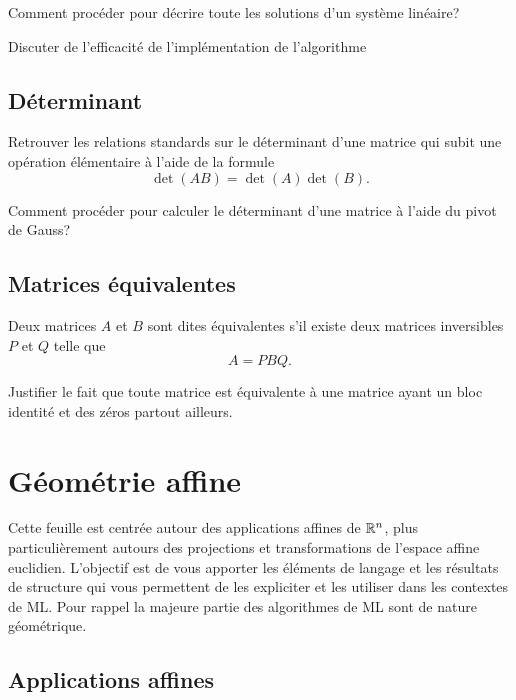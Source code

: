 \documentclass[11pt, a4paper]{article}
\begin{document}
\begin{question}
  Comment procéder pour décrire toute les solutions d'un système
  linéaire?
\end{question}

\begin{question}
  Discuter de l'efficacité de l'implémentation de l'algorithme
\end{question}

\subsection{Déterminant}

\begin{question}
  Retrouver les relations standards sur le déterminant d'une matrice
  qui subit une opération élémentaire à l'aide de la formule
  \[
  \det(AB) = \det(A)\det(B).
  \]
\end{question}

\begin{question}
  Comment procéder pour calculer le déterminant d'une matrice à l'aide
  du pivot de Gauss?
\end{question}

\subsection{Matrices équivalentes}

\noindent Deux matrices $A$ et $B$ sont dites équivalentes s'il
existe deux matrices inversibles $P$ et $Q$ telle que
\[
A = PBQ.
\]
\begin{question}
  Justifier le fait que toute matrice est équivalente à une matrice
  ayant un bloc identité et des zéros partout ailleurs.
\end{question}


\section{Géométrie affine}

Cette feuille est centrée autour des applications affines de $\mathbb{R}^n$,
plus particulièrement autours des projections et transformations de
l'espace affine euclidien. L'objectif est de vous apporter les
éléments de langage et les résultats de structure qui vous permettent
de les expliciter et les utiliser dans les contextes de ML. Pour
rappel la majeure partie des algorithmes de ML sont de nature
géométrique.

\subsection{Applications affines}
\label{sec:defnappaffine}
\end{document}
